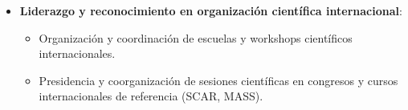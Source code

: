 \documentclass[11pt,a4paper]{article}
\begin{document}
\begin{itemize}[leftmargin=*]
    \item \textbf{Liderazgo y reconocimiento en organización científica internacional}:
    \begin{itemize}
        \item Organización y coordinación de escuelas y workshops científicos internacionales.
        \item Presidencia y coorganización de sesiones científicas en congresos y cursos internacionales de referencia (SCAR,  MASS).
    \end{itemize}

\end{itemize}
\vspace{2em}
\end{document}
